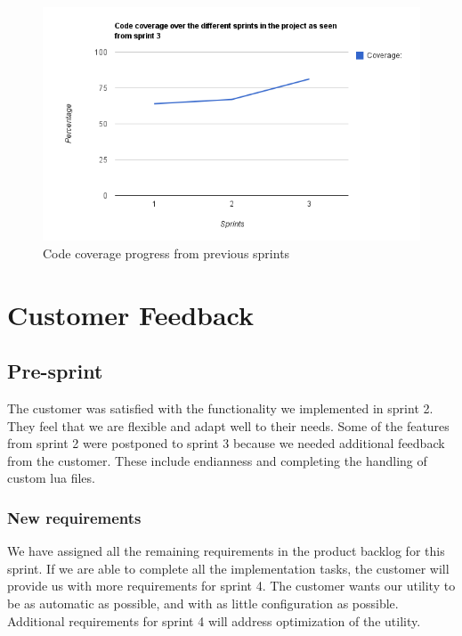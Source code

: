 \begin{figure}[ht]
	\center
	\includegraphics[width=\textwidth]{./sprints/img/sprint3_code_coverage_chart.png}
	\caption{Code coverage progress from previous sprints\label{fig:sp3CoverageChart}}
\end{figure}


\section{Customer Feedback}

\subsection{Pre-sprint}

The customer was satisfied with the functionality we implemented in sprint 2.
They feel that we are flexible and adapt well to their needs.
Some of the features from sprint 2 were postponed to sprint 3 because we needed additional feedback from the customer.
These include \gls{endianness} and completing the handling of custom \Gls{lua} files.

\subsubsection{New requirements}

We have assigned all the remaining requirements in the product backlog for this sprint.
If we are able to complete all the implementation tasks, the customer will provide us with more requirements for sprint 4.
The customer wants our \gls{utility} to be as automatic as possible, and with as little configuration as possible. 
Additional requirements for sprint 4 will address optimization of the \gls{utility}.

